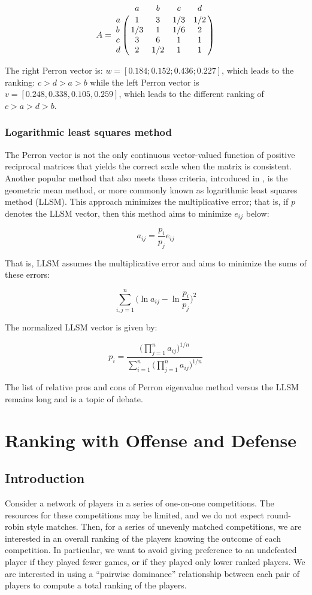 \documentclass[a4,11pt,twoside,leqno]{report}
\theoremstyle{definition}
\theoremstyle{remark}
\numberwithin{equation}{section}
\begin{document}
$$A=\bordermatrix{\ & a & b & c & d \cr a & 1 & 3 & 1/3 & 1/2  \cr b & 1/3 & 1 & 1/6 & 2 \cr c & 3 & 6 & 1 &1\cr d & 2 & 1/2 & 1 & 1}$$

\vspace{5mm}

The right Perron vector is: $w=[0.184; 0.152; 0.436; 0.227]$, which leads to the ranking: $c>d >a >b$ while the left Perron vector is $v=[0.248, 0.338, 0.105, 0.259]$, which leads to the different ranking of $c>a>d>b$.

\subsection{Logarithmic least squares method}

The Perron vector is not the only continuous vector-valued function of positive reciprocal matrices that yields the correct scale when the matrix is consistent. Another popular method that also meets these criteria, introduced in \cite{crawford}, is the geometric mean method, or more commonly known as logarithmic least squares method (LLSM). This approach minimizes the multiplicative error; that is, if $p$ denotes the LLSM vector, then this method aims to minimize $e_{ij}$ below:

$$a_{ij}=\frac{p_i}{p_j}e_{ij}$$

That is, LLSM assumes the multiplicative error and aims to minimize the sums of these errors:

$$\displaystyle \sum_{i,j=1}^n \big(\ln{a_{ij}}-\ln{\frac{p_i}{p_j}}\big)^2$$


The normalized LLSM vector is given by:

$$p_i= \frac{\displaystyle\Big(\prod_{j=1}^n a_{ij}\Big)^{1/n}}{\displaystyle \sum_{i=1}^{n}\Big(\prod_{j=1}^n a_{ij}\Big)^{1/n}}$$

The list of relative pros and cons of Perron eigenvalue method versus the LLSM remains long and is a topic of debate. 

\chapter{Ranking with Offense and Defense}

\section{Introduction}
Consider a network of players in a series of one-on-one competitions.
The resources for these competitions may be limited, and we do not expect
round-robin style matches.  Then, for a series of unevenly matched competitions,
we are interested in an overall ranking of the players knowing the outcome of
each competition.  In particular, we want to avoid giving preference to an
undefeated player if they played fewer games, or if they played only lower
ranked players.  We are interested in using a ``pairwise dominance''
relationship between each pair of players to compute a total ranking of the
players.
\end{document}
